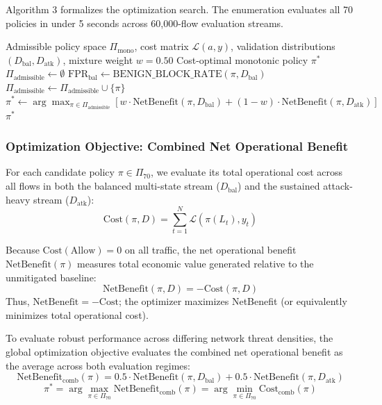 \documentclass[journal,10pt,onecolumn]{IEEEtran}
\begin{document}
Algorithm 3 formalizes the optimization search. The enumeration evaluates all 70 policies in under 5 seconds across 60,000-flow evaluation streams.

\begin{algorithm}[t]
\caption{Decision-Theoretic Combinatorial Policy Optimization}
\label{alg:policy_opt}
\begin{algorithmic}[1]
\Require Admissible policy space $\Pi_{\text{mono}}$, cost matrix $\mathcal{L}(a, y)$, validation distributions $(D_{\text{bal}}, D_{\text{atk}})$, mixture weight $w=0.50$
\Ensure Cost-optimal monotonic policy $\pi^*$
\State $\Pi_{\text{admissible}} \leftarrow \emptyset$
    \State $\text{FPR}_{\text{bal}} \leftarrow \text{BENIGN\_BLOCK\_RATE}(\pi, D_{\text{bal}})$
     
        \State $\Pi_{\text{admissible}} \leftarrow \Pi_{\text{admissible}} \cup \{\pi\}$
    \EndIf
\EndFor
\State $\pi^* \leftarrow \arg\max_{\pi \in \Pi_{\text{admissible}}} \left[ w \cdot \text{NetBenefit}(\pi, D_{\text{bal}}) + (1 - w) \cdot \text{NetBenefit}(\pi, D_{\text{atk}}) \right]$
\State \Return $\pi^*$
\end{algorithmic}
\end{algorithm}


\subsubsection{Optimization Objective: Combined Net Operational Benefit}
For each candidate policy $\pi \in \Pi_{70}$, we evaluate its total operational cost across all flows in both the balanced multi-state stream ($D_{\text{bal}}$) and the sustained attack-heavy stream ($D_{\text{atk}}$):
$$\text{Cost}(\pi, D) = \sum_{t=1}^N \mathcal{L}(\pi(L_t), y_t)$$

Because $\text{Cost}(\text{Allow}) = 0$ on all traffic, the net operational benefit $\text{NetBenefit}(\pi)$ measures total economic value generated relative to the unmitigated baseline:
$$\text{NetBenefit}(\pi, D) = -\text{Cost}(\pi, D)$$
Thus, $\text{NetBenefit} = -\text{Cost}$; the optimizer maximizes NetBenefit (or equivalently minimizes total operational cost).

To evaluate robust performance across differing network threat densities, the global optimization objective evaluates the combined net operational benefit as the average across both evaluation regimes:
$$\text{NetBenefit}_{\text{comb}}(\pi) = 0.5 \cdot \text{NetBenefit}(\pi, D_{\text{bal}}) + 0.5 \cdot \text{NetBenefit}(\pi, D_{\text{atk}})$$
$$\pi^* = \arg\max_{\pi \in \Pi_{70}} \text{NetBenefit}_{\text{comb}}(\pi) = \arg\min_{\pi \in \Pi_{70}} \text{Cost}_{\text{comb}}(\pi)$$
\end{document}

